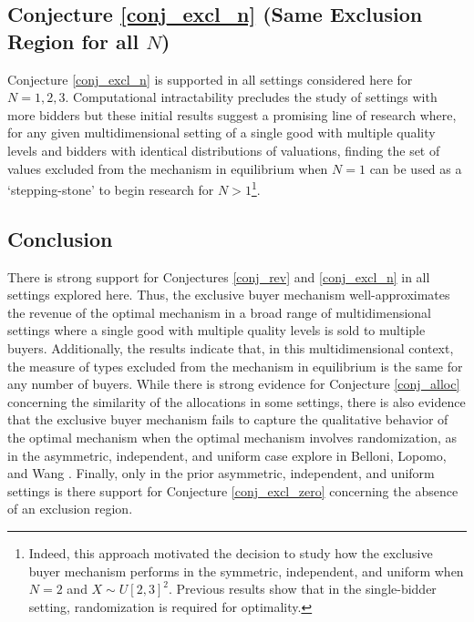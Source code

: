 \subsection{Conjecture \ref{conj_excl_n} (Same Exclusion Region for all $N$)}

Conjecture \ref{conj_excl_n} is supported in all settings considered here for $N=1,2,3$. Computational intractability precludes the study of settings with more bidders but these initial results suggest a promising line of research where, for any given multidimensional setting of a single good with multiple quality levels and bidders with identical distributions of valuations, finding the set of values excluded from the mechanism in equilibrium when $N=1$ can be used as a `stepping-stone' to begin research for $N>1$\footnote{Indeed, this approach motivated the decision to study how the exclusive buyer mechanism performs in the symmetric, independent, and uniform when $N=2$ and $X \sim U[2,3]^2$. Previous results \autocite{pavlov2011optimal} show that in the single-bidder setting, randomization is required for optimality.}. 











\subsection{Conclusion}

There is strong support for Conjectures \ref{conj_rev} and \ref{conj_excl_n} in all settings explored here. Thus, the exclusive buyer mechanism well-approximates the revenue of the optimal mechanism in a broad range of multidimensional settings where a single good with multiple quality levels is sold to multiple buyers. Additionally, the results indicate that, in this multidimensional context, the measure of types excluded from the mechanism in equilibrium is the same for any number of buyers. While there is strong evidence for Conjecture \ref{conj_alloc} concerning the similarity of the allocations in some settings, there is also evidence that the exclusive buyer mechanism fails to capture the qualitative behavior of the optimal mechanism when the optimal mechanism involves randomization, as in the asymmetric, independent, and uniform case explore in Belloni, Lopomo, and Wang \autocite*{belloni2010multidimensional}. Finally, only in the prior asymmetric, independent, and uniform settings is there support for Conjecture \ref{conj_excl_zero} concerning the absence of an exclusion region.

